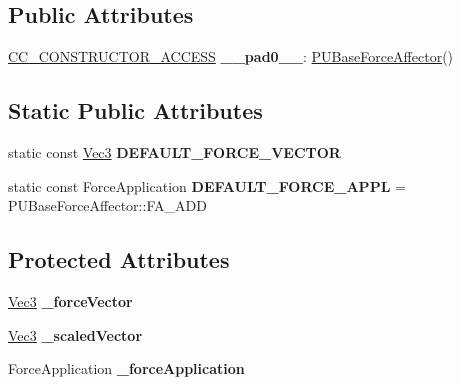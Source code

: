 \subsection*{Public Attributes}
\begin{DoxyCompactItemize}
\item 
\mbox{\label{classPUBaseForceAffector_afe5ebe736560e46f33b7a9ef3b9a92d1}} 
\hyperlink{_2cocos2d_2cocos_2base_2ccConfig_8h_a25ef1314f97c35a2ed3d029b0ead6da0}{C\+C\+\_\+\+C\+O\+N\+S\+T\+R\+U\+C\+T\+O\+R\+\_\+\+A\+C\+C\+E\+SS} {\bfseries \+\_\+\+\_\+pad0\+\_\+\+\_\+}\+: \hyperlink{classPUBaseForceAffector}{P\+U\+Base\+Force\+Affector}()
\end{DoxyCompactItemize}
\subsection*{Static Public Attributes}
\begin{DoxyCompactItemize}
\item 
\mbox{\label{classPUBaseForceAffector_ab6bea70cc052dc22477f46d18698c43c}} 
static const \hyperlink{classVec3}{Vec3} {\bfseries D\+E\+F\+A\+U\+L\+T\+\_\+\+F\+O\+R\+C\+E\+\_\+\+V\+E\+C\+T\+OR}
\item 
\mbox{\label{classPUBaseForceAffector_a98722e57841a824ef4407996d8fc5935}} 
static const Force\+Application {\bfseries D\+E\+F\+A\+U\+L\+T\+\_\+\+F\+O\+R\+C\+E\+\_\+\+A\+P\+PL} = P\+U\+Base\+Force\+Affector\+::\+F\+A\+\_\+\+A\+DD
\end{DoxyCompactItemize}
\subsection*{Protected Attributes}
\begin{DoxyCompactItemize}
\item 
\mbox{\label{classPUBaseForceAffector_aec8f6092d7a121b4de326c3e91f135d3}} 
\hyperlink{classVec3}{Vec3} {\bfseries \+\_\+force\+Vector}
\item 
\mbox{\label{classPUBaseForceAffector_a95948cd848e420e6549e9a754b0ce250}} 
\hyperlink{classVec3}{Vec3} {\bfseries \+\_\+scaled\+Vector}
\item 
\mbox{\label{classPUBaseForceAffector_a9e10d12730bfb7558b0a09edf47ff26d}} 
Force\+Application {\bfseries \+\_\+force\+Application}
\end{DoxyCompactItemize}
